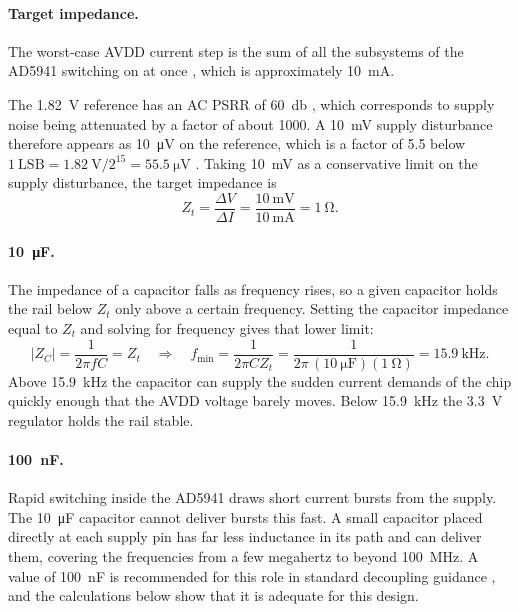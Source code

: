 \paragraph{Target impedance.}
The worst-case AVDD current step is the sum of all the subsystems of the
AD5941 switching on at once \cite[p.~14]{ad5941_ds}, which is approximately
\SI{10}{\milli\ampere}.

The \SI{1.82}{\volt} reference has an AC PSRR of \SI{60}{\decibel}
\cite[p.~11]{ad5941_ds}, which corresponds to supply noise being attenuated by
a factor of about 1000. A \SI{10}{\milli\volt} supply disturbance therefore
appears as \SI{10}{\micro\volt} on the reference, which is a factor of 5.5
below $1~\text{LSB} = \SI{1.82}{\volt}/2^{15} = \SI{55.5}{\micro\volt}$
\cite[p.~7]{ad5941_ds}. Taking \SI{10}{\milli\volt} as a conservative limit on
the supply disturbance, the target impedance is
\begin{equation}
  Z_t = \frac{\Delta V}{\Delta I}
      = \frac{\SI{10}{\milli\volt}}{\SI{10}{\milli\ampere}}
      = \SI{1}{\ohm}.
  \label{eq:hw_ztarget}
\end{equation}
 
\paragraph{\SI{10}{\micro\farad}.}
The impedance of a capacitor falls as frequency rises, so a given capacitor
holds the rail below $Z_t$ only above a certain frequency. Setting the
capacitor impedance equal to $Z_t$ and solving for frequency gives that lower
limit:
\begin{equation}
  |Z_C| = \frac{1}{2\pi f C} = Z_t
  \quad\Rightarrow\quad
  f_\text{min} = \frac{1}{2\pi C Z_t}
               = \frac{1}{2\pi\,(\SI{10}{\micro\farad})(\SI{1}{\ohm})}
               = \SI{15.9}{\kilo\hertz}.
  \label{eq:hw_fmin}
\end{equation}
Above \SI{15.9}{\kilo\hertz} the capacitor can supply the sudden current
demands of the chip quickly enough that the AVDD voltage barely moves. Below
\SI{15.9}{\kilo\hertz} the \SI{3.3}{\volt} regulator holds the rail stable.
 
\paragraph{\SI{100}{\nano\farad}.}
Rapid switching inside the AD5941 draws short current bursts from the supply.
The \SI{10}{\micro\farad} capacitor cannot deliver bursts this fast. A small
capacitor placed directly at each supply pin has far less inductance in its
path and can deliver them, covering the frequencies from a few megahertz to
beyond \SI{100}{\mega\hertz}. A value of \SI{100}{\nano\farad} is recommended
for this role in standard decoupling guidance
\cite{adi_mt101, ott2009emc, horowitz2015art}, and the calculations below show
that it is adequate for this design.
 
